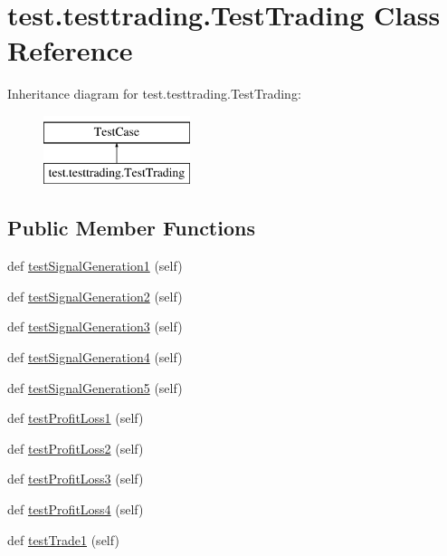 \hypertarget{classtest_1_1testtrading_1_1TestTrading}{}\section{test.\+testtrading.\+Test\+Trading Class Reference}
\label{classtest_1_1testtrading_1_1TestTrading}
Inheritance diagram for test.\+testtrading.\+Test\+Trading\+:\begin{figure}[H]
\begin{center}
\leavevmode
\includegraphics[height=2.000000cm]{classtest_1_1testtrading_1_1TestTrading}
\end{center}
\end{figure}
\subsection*{Public Member Functions}
\begin{DoxyCompactItemize}
\item 
def \hyperlink{classtest_1_1testtrading_1_1TestTrading_a428be4083e5f6130022d680385742c37}{test\+Signal\+Generation1} (self)
\item 
def \hyperlink{classtest_1_1testtrading_1_1TestTrading_a0a3a1e94ab4195b6eb4cf6f8a3e96a11}{test\+Signal\+Generation2} (self)
\item 
def \hyperlink{classtest_1_1testtrading_1_1TestTrading_af42ccddb031cfaa9662efa049fba073d}{test\+Signal\+Generation3} (self)
\item 
def \hyperlink{classtest_1_1testtrading_1_1TestTrading_a3bb0a3ee69ffdb02c45c76cec97dfe46}{test\+Signal\+Generation4} (self)
\item 
def \hyperlink{classtest_1_1testtrading_1_1TestTrading_a1314bb991d7ae8a7f0bb708392be6b8f}{test\+Signal\+Generation5} (self)
\item 
def \hyperlink{classtest_1_1testtrading_1_1TestTrading_ae24881ed7effd9e9cd012a8bce93ff18}{test\+Profit\+Loss1} (self)
\item 
def \hyperlink{classtest_1_1testtrading_1_1TestTrading_aed815691829a73306aa7f17bd6b95c3b}{test\+Profit\+Loss2} (self)
\item 
def \hyperlink{classtest_1_1testtrading_1_1TestTrading_a996cc7999e191d67410789030eabdf1c}{test\+Profit\+Loss3} (self)
\item 
def \hyperlink{classtest_1_1testtrading_1_1TestTrading_af3110d4d491f6d1a4cc67916c6c189a2}{test\+Profit\+Loss4} (self)
\item 
def \hyperlink{classtest_1_1testtrading_1_1TestTrading_a4684dd9999fdf9a9c7e898f6a617c1f3}{test\+Trade1} (self)
\end{DoxyCompactItemize}


